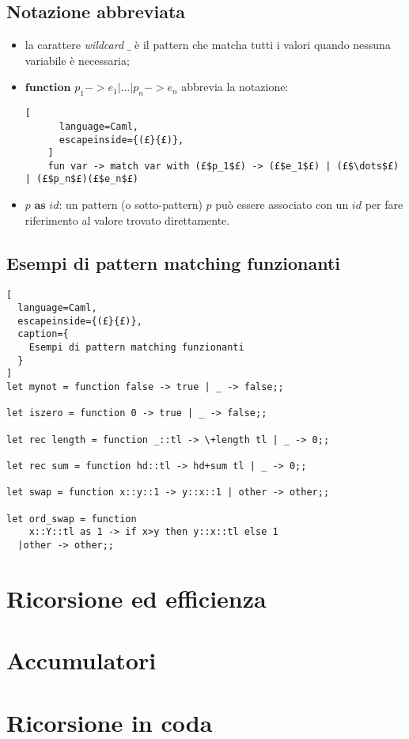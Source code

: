 \subsection{Notazione abbreviata}
\begin{itemize}
  \item la carattere \textit{wildcard} $\_$ è il pattern che matcha tutti i
    valori quando nessuna variabile è necessaria;
  \item $\textbf{function } p_1->e_1|\dots|p_n->e_n$ abbrevia la notazione:
    \begin{lstlisting}[
      language=Caml,
      escapeinside={(£}{£)},
    ]
    fun var -> match var with (£$p_1$£) -> (£$e_1$£) | (£$\dots$£) | (£$p_n$£)(£$e_n$£)
    \end{lstlisting}
  \item $p \textbf{ as } id$: un pattern (o sotto-pattern) $p$ può essere
    associato con un $id$ per fare riferimento al valore trovato direttamente.
\end{itemize}

\subsection{Esempi di pattern matching funzionanti}
\begin{lstlisting}[
  language=Caml,
  escapeinside={(£}{£)},
  caption={
    Esempi di pattern matching funzionanti
  }
]
let mynot = function false -> true | _ -> false;;

let iszero = function 0 -> true | _ -> false;;

let rec length = function _::tl -> \+length tl | _ -> 0;;

let rec sum = function hd::tl -> hd+sum tl | _ -> 0;;

let swap = function x::y::1 -> y::x::1 | other -> other;;

let ord_swap = function
    x::Y::tl as 1 -> if x>y then y::x::tl else 1
  |other -> other;;
\end{lstlisting}

\section{Ricorsione ed efficienza}

\section{Accumulatori}

\section{Ricorsione in coda}


